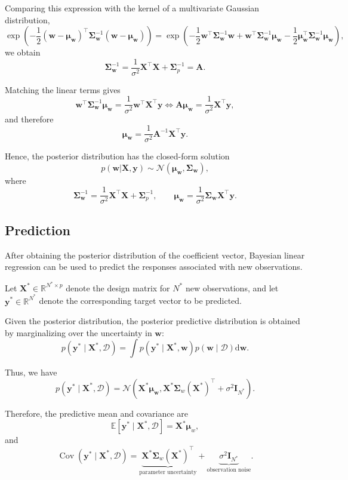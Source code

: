 \documentclass[../Bayesian_Inference.tex]{subfiles}
\begin{document}
Comparing this expression with the kernel of a multivariate Gaussian distribution,
\[
    \exp\left(-\frac{1}{2} (\bm{w} - \bm{\mu}_{\bm{w}})^{\top} \mathbf{\Sigma}_{\bm{w}}^{-1} (\bm{w} - \bm{\mu}_{\bm{w}}) \right) = 
    \exp\left( -\frac{1}{2} \bm{w}^{\top} \mathbf{\Sigma}_{\bm{w}}^{-1} \bm{w} + \bm{w}^{\top} \mathbf{\Sigma}_{\bm{w}}^{-1} \bm{\mu}_{\bm{w}} - \frac{1}{2} \bm{\mu}_{\bm{w}}^{\top} \mathbf{\Sigma}_{\bm{w}}^{-1} \bm{\mu}_{\bm{w}} \right),
\]
we obtain
\[
    \mathbf{\Sigma}_{\bm{w}}^{-1} = \frac{1}{\sigma^{2}} \mathbf{X}^{\top} \mathbf{X} + \mathbf{\Sigma}_{p}^{-1} = \mathbf{A}.
\]

Matching the linear terms gives
\[
    \bm{w}^{\top} \mathbf{\Sigma}_{\bm{w}}^{-1} \bm{\mu}_{\bm{w}} = \frac{1}{\sigma^{2}} \bm{w}^{\top} \mathbf{X}^{\top} \bm{y} \Leftrightarrow \mathbf{A} \bm{\mu}_{\bm{w}} = \frac{1}{\sigma^{2}} \mathbf{X}^{\top} \bm{y},
\]
and therefore
\[
    \bm{\mu}_{\bm{w}} = \frac{1}{\sigma^{2}} \mathbf{A}^{-1} \mathbf{X}^{\top} \bm{y}.
\]

Hence, the posterior distribution has the closed-form solution
\[
    p(\bm{w} | \mathbf{X}, \bm{y}) \sim \mathcal{N}(\bm{\mu}_{\bm{w}}, \mathbf{\Sigma}_{\bm{w}}),
\]
where 
\[
    \mathbf{\Sigma}_{\bm{w}}^{-1} = \frac{1}{\sigma^{2}} \mathbf{X}^{\top} \mathbf{X} + \mathbf{\Sigma}_{p}^{-1}, \qquad \bm{\mu}_{\bm{w}} = \frac{1}{\sigma^{2}} \mathbf{\Sigma}_{\bm{w}} \mathbf{X}^{\top} \bm{y}.
\]


\subsection{Prediction}

After obtaining the posterior distribution of the coefficient vector, Bayesian linear regression can be used to predict the responses associated with new observations.

Let $\mathbf{X}^{*}\in\mathbb{R}^{N^{*}\times p}$ denote the design matrix for $N^{*}$ new observations, and let $\bm{y}^{*}\in\mathbb{R}^{N^{*}}$ denote the corresponding target vector to be predicted.

Given the posterior distribution, the posterior predictive distribution is obtained by marginalizing over the uncertainty in $\bm{w}$:
\[
    p(\bm{y}^{*}\mid\mathbf{X}^{*},\mathcal{D}) = \int p(\bm{y}^{*}\mid\mathbf{X}^{*},\bm{w})p(\bm{w}\mid\mathcal{D})\mathrm{d}\bm{w}.
\]

Thus, we have 
\[
    p(\bm{y}^{*}\mid\mathbf{X}^{*},\mathcal{D}) = \mathcal{N}\left(\mathbf{X}^{*}\bm{\mu}_{\bm{w}}, \mathbf{X}^{*}\mathbf{\Sigma}_{w}(\mathbf{X}^{*})^{\top} + \sigma^{2}\mathbf{I}_{N^{*}} \right).
\]

Therefore, the predictive mean and covariance are
\[
    \mathbb{E}\left[\bm{y}^{*}\mid\mathbf{X}^{*},\mathcal{D}\right]=\mathbf{X}^{*}\bm{\mu}_{w},
\]
and
\[
    \operatorname{Cov}\left(\bm{y}^{*}\mid\mathbf{X}^{*},\mathcal{D}\right)=\underbrace{\mathbf{X}^{*}\mathbf{\Sigma}_{w}(\mathbf{X}^{*})^{\top}}_{\text{parameter uncertainty}} + \underbrace{\sigma^{2}\mathbf{I}_{N^{*}}}_{\text{observation noise}}.
\]
\end{document}
